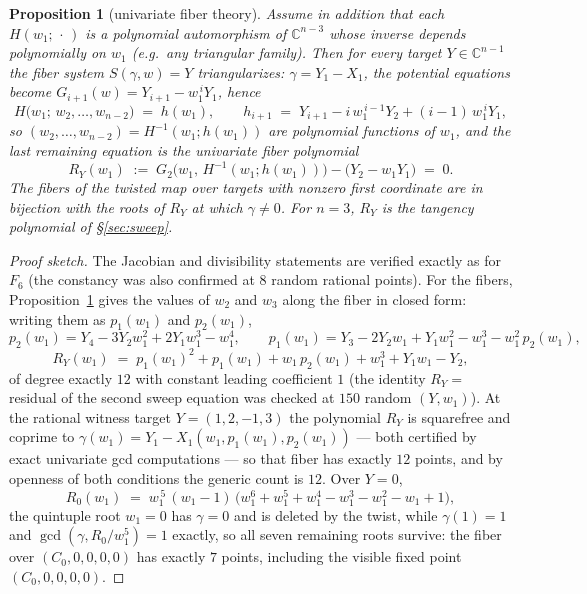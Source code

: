 \documentclass[10pt,a4paper]{amsart}
\newtheorem{proposition}{Proposition}
\newcommand{\C}{\mathbb{C}}
\begin{document}
\begin{proposition}[univariate fiber theory]\label{prop:curvefib}
Assume in addition that each $H(w_1;\,\cdot\,)$ is a polynomial automorphism
of $\C^{n-3}$ whose inverse depends polynomially on $w_1$ (e.g.\ any
triangular family). Then for every target $Y\in\C^{n-1}$ the fiber system
$S(\gamma,w)=Y$ triangularizes: $\gamma=Y_1-X_1$, the potential equations
become $G_{i+1}(w)=Y_{i+1}-w_1^{\,i}Y_1$, hence
\[
H\bigl(w_1;\,w_2,\dots,w_{n-2}\bigr)\;=\;h(w_1),
\qquad
h_{i+1}\;=\;Y_{i+1}-i\,w_1^{\,i-1}Y_2+(i-1)\,w_1^{\,i}Y_1 ,
\]
so $(w_2,\dots,w_{n-2})=H^{-1}(w_1;h(w_1))$ are polynomial functions of $w_1$,
and the last remaining equation is the univariate \emph{fiber polynomial}
\[
R_Y(w_1)\;:=\;G_2\bigl(w_1,\,H^{-1}(w_1;h(w_1))\bigr)-\bigl(Y_2-w_1Y_1\bigr)
\;=\;0 .
\]
The fibers of the twisted map over targets with nonzero first coordinate are
in bijection with the roots of $R_Y$ at which $\gamma\neq0$. For $n=3$, $R_Y$
is the tangency polynomial of \S\ref{sec:sweep}.
\end{proposition}

\begin{proof}[Proof sketch]
The Jacobian and divisibility statements are verified exactly as for $F_6$
(the constancy was also confirmed at $8$ random rational points). For the
fibers, Proposition~\ref{prop:curvefib} gives the values of $w_2$ and $w_3$
along the fiber in closed form: writing them as $p_1(w_1)$ and $p_2(w_1)$,
\[
p_2(w_1)=Y_4-3Y_2w_1^2+2Y_1w_1^3-w_1^4,\qquad
p_1(w_1)=Y_3-2Y_2w_1+Y_1w_1^2-w_1^3-w_1^2\,p_2(w_1),
\]
\[
R_Y(w_1)\;=\;p_1(w_1)^2+p_1(w_1)+w_1\,p_2(w_1)+w_1^3+Y_1w_1-Y_2 ,
\]
of degree exactly $12$ with constant leading coefficient $1$ (the identity
$R_Y=$ residual of the second sweep equation was checked at $150$ random
$(Y,w_1)$). At the rational witness target $Y=(1,2,-1,3)$ the polynomial
$R_Y$ is squarefree and coprime to $\gamma(w_1)=Y_1-X_1(w_1,p_1(w_1),p_2(w_1))$
--- both certified by exact univariate gcd computations --- so that fiber has
exactly $12$ points, and by openness of both conditions the generic count is
$12$. Over $Y=0$,
\[
R_0(w_1)\;=\;w_1^{\,5}\,(w_1-1)\,
\bigl(w_1^6+w_1^5+w_1^4-w_1^3-w_1^2-w_1+1\bigr),
\]
the quintuple root $w_1=0$ has $\gamma=0$ and is deleted by the twist, while
$\gamma(1)=1$ and $\gcd(\gamma,R_0/w_1^5)=1$ exactly, so all seven remaining
roots survive: the fiber over $(C_0,0,0,0,0)$ has exactly $7$ points,
including the visible fixed point $(C_0,0,0,0,0)$.
\end{proof}
\end{document}
